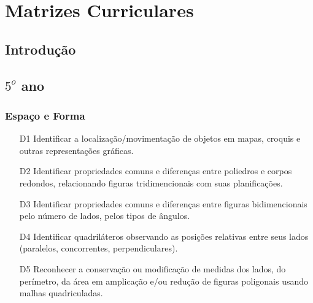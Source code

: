 \chapter{Matrizes Curriculares}
\section*{Introdução}


\section{$5^o$ ano}
\subsection{Espaço e Forma}
\begin{enumerate}
    \item[D1] \label{itm5:D1} Identificar a localização/movimentação de objetos em mapas, croquis e outras representações gráficas.
    \item[D2] \label{itm5:D2} Identificar propriedades comuns e diferenças entre poliedros e corpos redondos, relacionando figuras tridimencionais com suas planificações.
    \item[D3] \label{itm5:D3} Identificar propriedades comuns e diferenças entre figuras bidimencionais pelo número de lados, pelos tipos de ângulos.
    \item[D4] \label{itm5:D4} Identificar quadriláteros observando as posições relativas entre seus lados (paralelos, concorrentes, perpendiculares).
    \item[D5] \label{itm5:D5} Reconhecer a conservação ou modificação de medidas dos lados, do perímetro, da área em amplicação e/ou redução de figuras poligonais usando malhas quadriculadas.
\end{enumerate}

